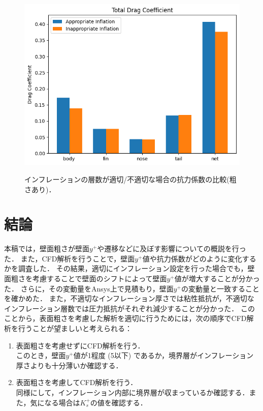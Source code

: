 \documentclass[uplatex,dvipdfmx,a4j,12pt]{jsarticle}
\begin{document}
\begin{figure}[H]
\begin{minipage}{0.45\linewidth}
      \centering
      \includegraphics[width=\linewidth]{wall_function/img/4_3_1_total_drag.png}
      \label{fig:4_3_1_cd_total}
  \end{minipage}
  \caption{インフレーションの層数が適切/不適切な場合の抗力係数の比較(粗さあり)．}
  \label{fig:4_3_cd_w_rough}
\end{figure}

\section{結論}
本稿では，壁面粗さが壁面$y^+$や遷移などに及ぼす影響についての概説を行った．
また，CFD解析を行うことで，壁面$y^+$値や抗力係数がどのように変化するかを調査した．
その結果，適切にインフレーション設定を行った場合でも，壁面粗さを考慮することで壁面のシフトによって壁面$y^+$値が増大することが分かった．
さらに，その変動量をAnsys上で見積もり，壁面$y^+$の変動量と一致することを確かめた．
また，不適切なインフレーション厚さでは粘性抵抗が，不適切なインフレーション層数では圧力抵抗がそれぞれ減少することが分かった．
このことから，表面粗さを考慮した解析を適切に行うためには，次の順序でCFD解析を行うことが望ましいと考えられる：
\begin{enumerate}
  \item 表面粗さを考慮せずにCFD解析を行う．\\
  このとき，壁面$y^+$値が1程度 (5以下) であるか，境界層がインフレーション厚さよりも十分薄いか確認する．
  \item 表面粗さを考慮してCFD解析を行う．\\
  同様にして，インフレーション内部に境界層が収まっているか確認する．また，気になる場合は$K_s^+$の値を確認する．
\end{enumerate}
\end{document}

